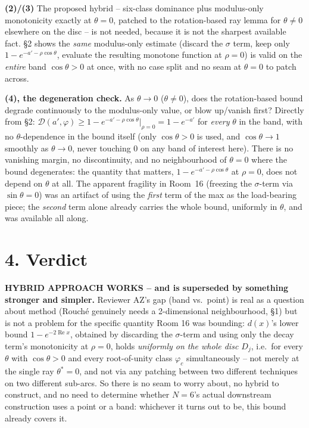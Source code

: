 \documentclass[11pt]{article}
\begin{document}
\textbf{(2)/(3)} The proposed hybrid -- six-class dominance plus modulus-only monotonicity exactly at
$\theta=0$, patched to the rotation-based ray lemma for $\theta\ne0$ elsewhere on the disc -- is not
needed, because it is not the sharpest available fact. \S2 shows the \emph{same} modulus-only estimate
(discard the $\sigma$ term, keep only $1-e^{-a'-\rho\cos\theta}$, evaluate the resulting monotone
function at $\rho=0$) is valid on the \emph{entire} band $\cos\theta>0$ at once, with no case split and
no seam at $\theta=0$ to patch across.

\textbf{(4), the degeneration check.} As $\theta\to0$ ($\theta\ne0$), does the rotation-based bound
degrade continuously to the modulus-only value, or blow up/vanish first? Directly from \S2:
$\mathcal D(a',\varphi)\ge1-e^{-a'-\rho\cos\theta}|_{\rho=0}=1-e^{-a'}$ for \emph{every} $\theta$ in the
band, with no $\theta$-dependence in the bound itself (only $\cos\theta>0$ is used, and $\cos\theta\to1$
smoothly as $\theta\to0$, never touching $0$ on any band of interest here). There is no vanishing
margin, no discontinuity, and no neighbourhood of $\theta=0$ where the bound degenerates: the quantity
that matters, $1-e^{-a'-\rho\cos\theta}$ at $\rho=0$, does not depend on $\theta$ at all. The apparent
fragility in Room~16 (freezing the $\sigma$-term via $\sin\theta=0$) was an artifact of using the
\emph{first} term of the max as the load-bearing piece; the \emph{second} term alone already carries the
whole bound, uniformly in $\theta$, and was available all along.

\section*{4. Verdict}

\textbf{HYBRID APPROACH WORKS -- and is superseded by something stronger and simpler.} Reviewer AZ's
gap (band vs.\ point) is real as a question about method (Rouch\'e genuinely needs a 2-dimensional
neighbourhood, \S1) but is not a problem for the specific quantity Room 16 was bounding: $d(x)$'s lower
bound $1-e^{-2\operatorname{Re}x}$, obtained by discarding the $\sigma$-term and using only the decay
term's monotonicity at $\rho=0$, holds \emph{uniformly on the whole disc $D_j$}, i.e.\ for every $\theta$
with $\cos\theta>0$ and every root-of-unity class $\varphi_c$ simultaneously -- not merely at the single
ray $\theta^\ast=0$, and not via any patching between two different techniques on two different
sub-arcs. So there is no seam to worry about, no hybrid to construct, and no need to determine whether
$N=6$'s actual downstream construction uses a point or a band: whichever it turns out to be, this bound
already covers it.
\end{document}
